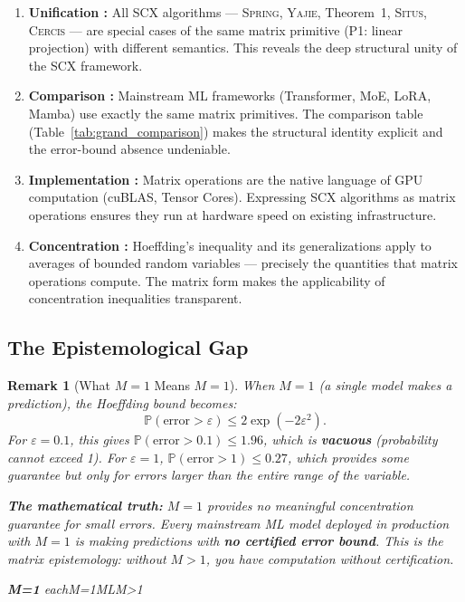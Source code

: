 \documentclass[12pt,a4paper]{article}
\newtheorem{remark}[theorem]{Remark}
\theoremstyle{definition}
\newcommand{\Situs}{\textsc{Situs}}
\newcommand{\Yajie}{\textsc{Yajie}}
\newcommand{\Spring}{\textsc{Spring}}
\newcommand{\Cercis}{\textsc{Cercis}}
\newcommand{\SCX}{\textsc{SCX}}
\newcommand{\Pbb}{\mathbb{P}}
\begin{document}
\begin{enumerate}[label=(\arabic*)]
    \item \textbf{Unification :} All \SCX{} algorithms — \Spring{}, \Yajie{}, 
    Theorem~1, \Situs{}, \Cercis{} — are special cases of the same matrix primitive 
    (P1: linear projection) with different semantics. This reveals the deep structural 
    unity of the \SCX{} framework.
    
    \item \textbf{Comparison :} Mainstream ML frameworks (Transformer, MoE, 
    LoRA, Mamba) use exactly the same matrix primitives. The comparison table 
    (Table~\ref{tab:grand_comparison}) makes the structural identity explicit and the 
    error-bound absence undeniable.
    
    \item \textbf{Implementation :} Matrix operations are the native language 
    of GPU computation (cuBLAS, Tensor Cores). Expressing \SCX{} algorithms as matrix 
    operations ensures they run at hardware speed on existing infrastructure.
    
    \item \textbf{Concentration :} Hoeffding's inequality and its generalizations 
    apply to averages of bounded random variables — precisely the quantities that 
    matrix operations compute. The matrix form makes the applicability of concentration 
    inequalities transparent.
\end{enumerate}

\subsection{The Epistemological Gap }

\begin{remark}[What $M=1$ Means $M=1$]
\label{rem:M_equals_one}
When $M=1$ (a single model makes a prediction), the Hoeffding bound becomes:
\[
\Pbb(\text{error} > \varepsilon) \leq 2\exp(-2\varepsilon^2).
\]
For $\varepsilon = 0.1$, this gives $\Pbb(\text{error} > 0.1) \leq 1.96$, which is 
\textbf{vacuous} (probability cannot exceed 1). For $\varepsilon = 1$, 
$\Pbb(\text{error} > 1) \leq 0.27$, which provides some guarantee but only for 
errors larger than the entire range of the variable. 

\textbf{The mathematical truth:} $M=1$ provides no meaningful concentration guarantee 
for small errors. Every mainstream ML model deployed in production with $M=1$ is 
making predictions with \textbf{no certified error bound}. This is the matrix 
epistemology: without $M > 1$, you have computation without certification.

\medskip
\noindent\textbf{M=1} eachM=1MLM>1
\end{remark}
\end{document}
